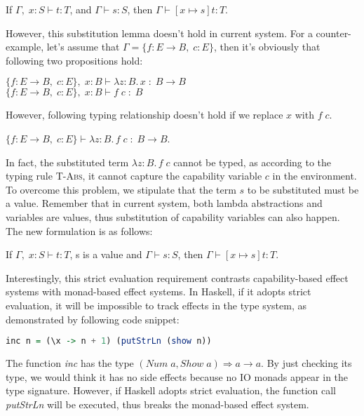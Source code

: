 \begin{lemma}
If $\Gamma,\; x:S \vdash t : T$, and $\Gamma \vdash s : S$, then $\Gamma
\vdash [x \mapsto s]t : T$.
\end{lemma}

However, this substitution lemma doesn't hold in current system. For a
counter-example, let's assume that $\Gamma = \{f: E \to B,\;
  c:E\}$, then it's obviously that following two propositions hold:


$\{f: E \to B,\; c:E\},\; x:B \vdash \lambda z:B.\,x \; : \; B \to
  B$ \\
$\{f: E \to B,\; c:E\},\; x:B \vdash f \; c \; : \; B$

However, following typing relationship doesn't hold if we replace
$x$ with $f \; c$.

$\{f: E \to B,\; c:E\} \vdash \lambda z:B.\,f \; c \; : \; B \to B$.

In fact, the substituted term $\lambda z:B.\,f \; c$ cannot be typed,
as according to the typing rule \textsc{T-Abs}, it cannot capture the
capability variable $c$ in the environment. To overcome this problem,
we stipulate that the term $s$ to be substituted must be a
value. Remember that in current system, both lambda abstractions and
variables are values, thus substitution of capability variables can
also happen. The new formulation is as follows:

\begin{lemma}
  If $\Gamma,\; x:S \vdash t : T$, s is a value and
  $\Gamma \vdash s : S$, then $\Gamma \vdash [x \mapsto s]t : T$.
\end{lemma}

Interestingly, this strict evaluation requirement contrasts
capability-based effect systems with monad-based effect systems. In
Haskell, if it adopts strict evaluation, it will be impossible to
track effects in the type system, as demonstrated by following code
snippet:

\begin{lstlisting}[language=Haskell]
  inc n = (\x -> n + 1) (putStrLn (show n))
\end{lstlisting}

The function \emph{inc} has the type
$(Num\;a, Show\;a) \Rightarrow a \to a$. By just checking its type, we
would think it has no side effects because no IO monads appear in the
type signature. However, if Haskell adopts strict evaluation, the
function call \emph{putStrLn} will be executed, thus breaks the
monad-based effect system.

